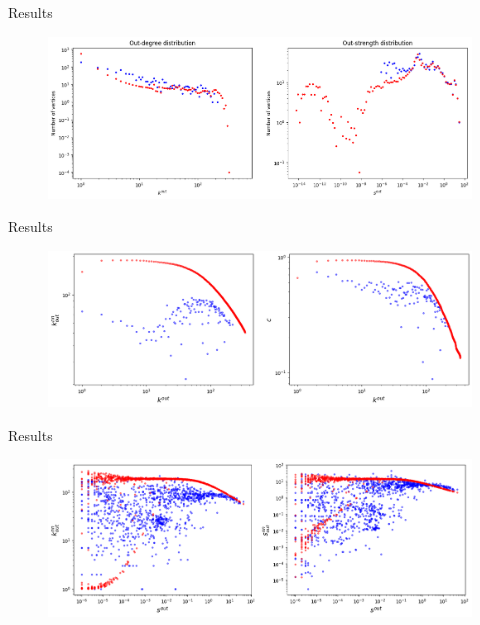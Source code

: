 \documentclass{beamer}
\begin{document}
\begin{frame}{Results}
\begin{figure}[!ht]
    \centering
    \includegraphics[scale=0.3]{img/Degree_corrected/degrees_strengths_hist.png}
\end{figure}
\end{frame}

\begin{frame}{Results}
\begin{figure}[!ht]
    \centering
    \includegraphics[scale=0.3]{img/Degree_corrected/annd_k_cl_coeff_k.png}
\end{figure}
\end{frame}

\begin{frame}{Results}
\begin{figure}[!ht]
    \centering
    \includegraphics[scale=0.3]{img/Degree_corrected/annd_anns.png}
\end{figure}
\end{frame}
\end{document}
